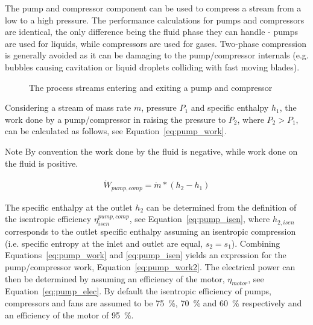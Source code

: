         The pump and compressor component can be used to compress a stream from a low to a high pressure. The performance calculations for pumps and compressors are identical, the only difference being the fluid phase they can handle - pumps are used for liquids, while compressors are used for gases. Two-phase compression is generally avoided as it can be damaging to the pump/compressor internals (e.g. bubbles causing cavitation or liquid droplets colliding with fast moving blades).

        \begin{figure}[H]
            \centering
            
            \caption{The process streams entering and exiting a pump and compressor}
            \label{fig:pump_comp}
        \end{figure}
    
        Considering a stream of mass rate \(\Dot{m}\), pressure \(P_1\) and specific enthalpy \(h_1\), the work done by a pump/compressor in raising the pressure to \(P_2\), where \(P_2 > P_1\), can be calculated as follows, see Equation~\eqref{eq:pump_work}. 
        
        \begin{notes}{Note}
            By convention the work done by the fluid is negative, while work done on the fluid is positive.
        \end{notes}

        \begin{align} 
            \Dot{W}_{pump, comp} = \Dot{m} * (h_2-h_1) \label{eq:pump_work}
        \end{align}

        The specific enthalpy at the outlet \(h_2\) can be determined from the definition of the isentropic efficiency \(\eta_{isen}^{pump, comp}\), see Equation~\eqref{eq:pump_isen}, where \(h_{2, isen}\) corresponds to the outlet specific enthalpy assuming an isentropic compression (i.e. specific entropy at the inlet and outlet are equal, \(s_2=s_1\)). Combining Equations~\ref{eq:pump_work} and \ref{eq:pump_isen} yields an expression for the pump/compressor work, Equation~\ref{eq:pump_work2}. The electrical power can then be determined by assuming an efficiency of the motor, \(\eta_{motor}\), see Equation~\ref{eq:pump_elec}. By default the isentropic efficiency of pumps, compressors and fans are assumed to be \qty{75}{\percent}, \qty{70}{\percent} and \qty{60}{\percent} respectively and an efficiency of the motor of \qty{95}{\percent}.

